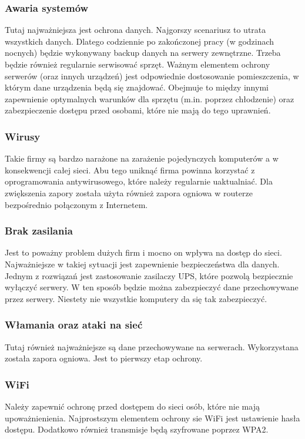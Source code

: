 \documentclass{article}
\begin{document}
\subsubsection{Awaria systemów}
Tutaj najważniejsza jest ochrona danych.  Najgorszy scenariusz to utrata wszystkich danych. Dlatego codziennie po zakończonej pracy (w godzinach nocnych) będzie wykonywany backup danych na serwery zewnętrzne. Trzeba będzie również regularnie serwisować sprzęt. Ważnym elementem ochrony serwerów (oraz innych urządzeń) jest odpowiednie dostosowanie pomieszczenia, w którym dane urządzenia będą się znajdować. Obejmuje to między innymi zapewnienie optymalnych warunków dla sprzętu (m.in. poprzez chłodzenie) oraz zabezpieczenie dostępu przed osobami, które nie mają do tego uprawnień.

\subsubsection{Wirusy}
Takie firmy są bardzo narażone na zarażenie pojedynczych komputerów a w konsekwencji całej sieci. Abu tego uniknąć firma powinna korzystać z oprogramowania antywirusowego, które należy regularnie uaktualniać. Dla zwiększenia zapory została użyta również zapora ogniowa w routerze bezpośrednio połączonym z Internetem.

\subsubsection{Brak zasilania}
Jest to poważny problem dużych firm i mocno on wpływa na dostęp do sieci. Najważniejsze w takiej sytuacji jest zapewnienie bezpieczeństwa dla danych. 
Jednym z rozwiązań jest zastosowanie zasilaczy UPS, które pozwolą bezpiecznie wyłączyć serwery.  W ten sposób będzie można zabezpieczyć dane przechowywane przez serwery. Niestety nie wszystkie komputery da się tak zabezpieczyć.

\subsubsection{Włamania oraz ataki na sieć}
Tutaj również najważniejsze są dane przechowywane na serwerach.
Wykorzystana została zapora ogniowa. Jest to pierwszy etap ochrony.

\subsubsection{WiFi}
Należy zapewnić ochronę przed dostępem do sieci osób, które nie mają upoważnienienia.
Najprostszym elementem ochrony sie WiFi jest ustawienie hasła dostępu. Dodatkowo również transmisje będą szyfrowane poprzez WPA2.
\end{document}
